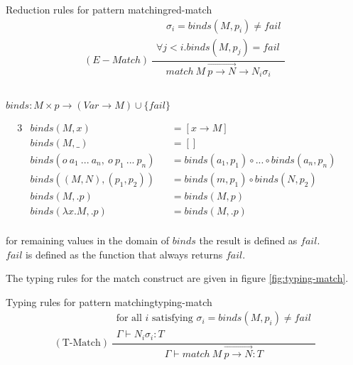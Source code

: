 \begin{myfigure}{Reduction rules for pattern matching}{red-match}
    \[
        (E-Match) \ \frac{
            \begin{gathered}
                \quad \sigma_i = binds(M,p_i) \neq fail\\
                \forall j < i.binds(M,p_j) = fail
            \end{gathered}
        }
        {match \ M \ \overrightarrow{p \rightarrow N} \rightarrow N_i \sigma_i }
    \]
    \\
    \begin{center}
        $binds : M \times p \rightarrow (Var \rightarrow M) \cup \{ fail \}$
    \end{center}
    \begin{alignat*}{3}
         & binds(M,x)                                        &  & = [x \rightarrow M]                              &  & \\
         & binds(M,\_)                                       &  & = []                                             &  & \\
         & binds(o \ a_1 \ ... \ a_n, \ o \ p_1 \ ... \ p_n) &  & = binds(a_1,p_1) \circ ... \circ binds(a_n, p_n) &  & \\
         & binds((M,N),(p_1,p_2))                            &  & = binds(m,p_1) \circ binds(N,p_2)                &  & \\
         & binds(M,.p)                                       &  & = binds(M,p)                                     &  & \\
         & binds(\lambda x.M,.p)                             &  & = binds(M,.p)                                    &  & \\
    \end{alignat*}
    \begin{center}
        for remaining values in the domain of $binds$ the result is defined as $fail$.\\
        $fail$ is defined as the function that always returns $fail$.
    \end{center}
\end{myfigure}

The typing rules for the match construct are given in figure \ref{fig:typing-match}.

\begin{myfigure}{Typing rules for pattern matching}{typing-match}
    \[
        (\text{T-Match}) \ \frac{
            \begin{gathered}
                \text{for all } i \text{ satisfying } \sigma_i = binds(M,p_i) \neq fail\\
                \Gamma \vdash N_i\sigma_i:T
            \end{gathered}
        }
        {\Gamma \vdash match \ M \ \overrightarrow{p \rightarrow N} : T}
    \]
\end{myfigure}

